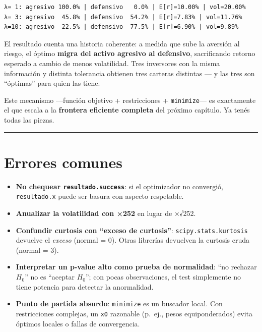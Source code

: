 \documentclass[
  spanish,
  letterpaper,
  DIV=11,
  numbers=noendperiod]{scrreprt}
\providecommand{\tightlist}{%
  \setlength{\itemsep}{0pt}\setlength{\parskip}{0pt}}
\begin{document}
\begin{verbatim}
λ= 1: agresivo 100.0% | defensivo   0.0% | E[r]=10.00% | vol=20.00%
λ= 3: agresivo  45.8% | defensivo  54.2% | E[r]=7.83% | vol=11.76%
λ=10: agresivo  22.5% | defensivo  77.5% | E[r]=6.90% | vol=9.89%
\end{verbatim}

El resultado cuenta una historia coherente: a medida que sube la
aversión al riesgo, el óptimo \textbf{migra del activo agresivo al
defensivo}, sacrificando retorno esperado a cambio de menos volatilidad.
Tres inversores con la misma información y distinta tolerancia obtienen
tres carteras distintas --- y las tres son ``óptimas'' para quien las
tiene.

Este mecanismo ---función objetivo + restricciones +
\texttt{minimize}--- es exactamente el que escala a la \textbf{frontera
eficiente completa} del próximo capítulo. Ya tenés todas las piezas.

\begin{center}\rule{0.5\linewidth}{0.5pt}\end{center}

\chapter{Errores comunes}\label{errores-comunes-5}

\begin{tcolorbox}[enhanced jigsaw, bottomrule=.15mm, colback=white, opacitybacktitle=0.6, arc=.35mm, toprule=.15mm, opacityback=0, breakable, titlerule=0mm, left=2mm, coltitle=black, colbacktitle=quarto-callout-warning-color!10!white, colframe=quarto-callout-warning-color-frame, leftrule=.75mm, toptitle=1mm, bottomtitle=1mm, title=\textcolor{quarto-callout-warning-color}{\faExclamationTriangle}\hspace{0.5em}{Trampas frecuentes}, rightrule=.15mm]

\begin{itemize}
\tightlist
\item
  \textbf{No chequear \texttt{resultado.success}}: si el optimizador no
  convergió, \texttt{resultado.x} puede ser basura con aspecto
  respetable.
\item
  \textbf{Anualizar la volatilidad con ×252} en lugar de ×√252.
\item
  \textbf{Confundir curtosis con ``exceso de curtosis''}:
  \texttt{scipy.stats.kurtosis} devuelve el \emph{exceso} (normal = 0).
  Otras librerías devuelven la curtosis cruda (normal = 3).
\item
  \textbf{Interpretar un p-value alto como prueba de normalidad}: ``no
  rechazar \(H_0\)'' no es ``aceptar \(H_0\)''; con pocas observaciones,
  el test simplemente no tiene potencia para detectar la anormalidad.
\item
  \textbf{Punto de partida absurdo}: \texttt{minimize} es un buscador
  local. Con restricciones complejas, un \texttt{x0} razonable (p.~ej.,
  pesos equiponderados) evita óptimos locales o fallas de convergencia.
\end{itemize}

\end{tcolorbox}
\end{document}
